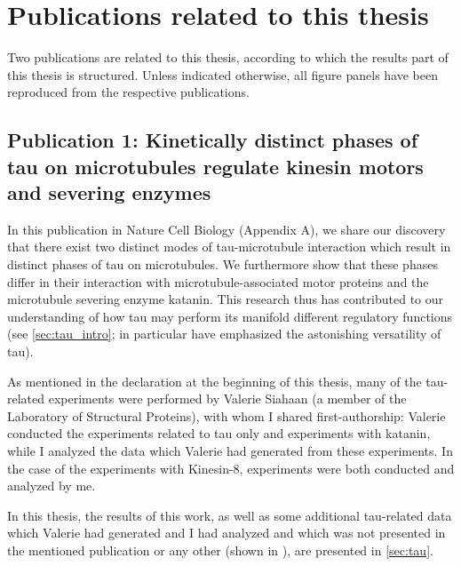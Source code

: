 \chapter{Publications related to this thesis}
\label{chap:publications}
Two publications are related to this thesis, according to which the results part of this thesis is structured. Unless indicated otherwise, all figure panels have been reproduced from the respective publications.

\section{Publication 1: Kinetically distinct phases of tau on microtubules regulate kinesin motors and severing enzymes}
In this publication in Nature Cell Biology \parencite{Siahaan2019a} (Appendix A), we share our discovery that there exist two distinct modes of tau-microtubule interaction which result in distinct phases of tau on microtubules. We furthermore show that these phases differ in their interaction with microtubule-associated motor proteins and the microtubule severing enzyme katanin. This research thus has contributed to our understanding of how tau may perform its manifold different regulatory functions (see \autoref{sec:tau_intro}; \cite{Morris2011b} in particular have emphasized the astonishing versatility of tau). \par

As mentioned in the declaration at the beginning of this thesis, many of the tau-related experiments were performed by Valerie Siahaan (a member of the Laboratory of Structural Proteins), with whom I shared first-authorship: Valerie conducted the experiments related to tau only and experiments with katanin, while I analyzed the data which Valerie had generated from these experiments. In the case of the experiments with Kinesin-8, experiments were both conducted and analyzed by me. \par

In this thesis, the results of this work, as well as some additional tau-related data which Valerie had generated and I had analyzed and which was not presented in the mentioned publication or any other (shown in ), are presented in \autoref{sec:tau}. 


